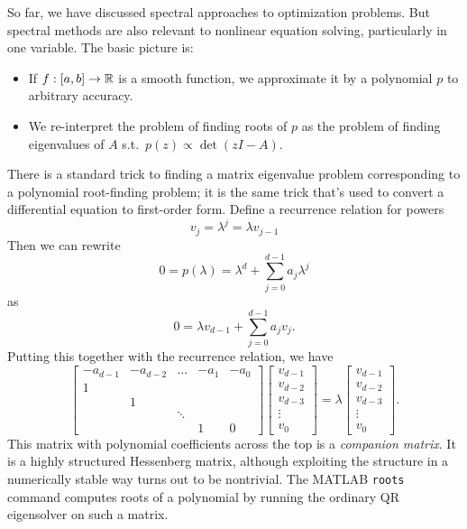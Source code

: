 \documentclass[12pt, leqno]{article} %
\begin{document}
So far, we have discussed spectral approaches to optimization
problems.  But spectral methods are also relevant to nonlinear
equation solving, particularly in one variable.  The basic picture is:
\begin{itemize}
\item
  If $f : [a,b] \rightarrow \mathbb{R}$ is a smooth function, we
  approximate it by a polynomial $p$ to arbitrary accuracy.
\item
  We re-interpret the problem of finding roots of $p$ as the problem
  of finding eigenvalues of $A$ s.t.~$p(z) \propto \det(z I-A)$.
\end{itemize}
There is a standard trick to finding a matrix eigenvalue problem
corresponding to a polynomial root-finding problem; it is the
same trick that's used to convert a differential equation to
first-order form.  Define a recurrence relation for powers
\[
  v_j = \lambda^j = \lambda v_{j-1}
\]
Then we can rewrite
\[
  0 = p(\lambda) = \lambda^d + \sum_{j=0}^{d-1} a_j \lambda^j
\]
as
\[
  0 = \lambda v_{d-1} + \sum_{j=0}^{d-1} a_j v_j.
\]
Putting this together with the recurrence relation, we have
\[
\begin{bmatrix}
  -a_{d-1} & -a_{d-2} & \ldots & -a_{1} & -a_{0} \\
  1 \\
    & 1 \\
    &   & \ddots \\
    &   &   & 1 & 0
\end{bmatrix}
\begin{bmatrix}
  v_{d-1} \\ v_{d-2} \\ v_{d-3} \\ \vdots \\ v_0
\end{bmatrix} =
\lambda
\begin{bmatrix}
  v_{d-1} \\ v_{d-2} \\ v_{d-3} \\ \vdots \\ v_0
\end{bmatrix}.
\]
This matrix with polynomial coefficients across the top is
a {\em companion matrix}.  It is a highly structured Hessenberg
matrix, although exploiting the structure in a numerically stable
way turns out to be nontrivial.  The MATLAB {\tt roots} command
computes roots of a polynomial by running the ordinary QR eigensolver
on such a matrix.
\end{document}
